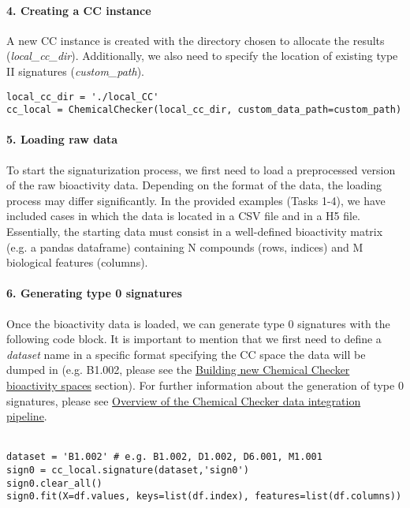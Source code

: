 \paragraph{4. Creating a CC instance} \leavevmode

A new CC instance is created with the directory chosen to allocate the results (\textit{local\_cc\_dir}). Additionally, we also need to specify the location of existing type II signatures (\textit{custom\_path}). \\

\begin{lstlisting}
local_cc_dir = './local_CC'
cc_local = ChemicalChecker(local_cc_dir, custom_data_path=custom_path)
\end{lstlisting}

\paragraph{5. Loading raw data} \leavevmode

To start the signaturization process, we first need to load a preprocessed version of the raw bioactivity data. Depending on the format of the data, the loading process may differ significantly. In the provided examples (Tasks 1-4), we have included cases in which the data is located in a CSV file and in a H5 file. Essentially, the starting data must consist in a well-defined bioactivity matrix (e.g. a pandas dataframe) containing N compounds (rows, indices) and M biological features (columns). 

\paragraph{6. Generating type 0 signatures} \leavevmode

Once the bioactivity data is loaded, we can generate type 0 signatures with the following code block. It is important to mention that we first need to define a \textit{dataset} name in a specific format specifying the CC space the data will be dumped in (e.g. B1.002, please see the \hyperref[Building_NEW_CC_BIOACTIVITY_SPACES]{Building new Chemical Checker bioactivity spaces} section). For further information about the generation of type 0 signatures, please see \hyperref[Overview of the Chemical Checker data integration pipeline]{Overview of the Chemical Checker data integration pipeline}. \\ \\

\begin{lstlisting}
dataset = 'B1.002' # e.g. B1.002, D1.002, D6.001, M1.001
sign0 = cc_local.signature(dataset,'sign0')
sign0.clear_all()
sign0.fit(X=df.values, keys=list(df.index), features=list(df.columns))
\end{lstlisting}


